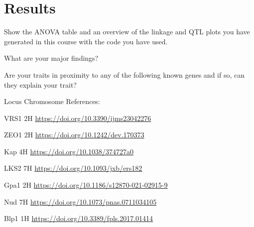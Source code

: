 \section{Results}

Show the ANOVA table and an overview of the linkage and QTL plots you have generated in this course with the code you have used.

What are your major findings?

Are your traits in proximity to any of the following known genes and if so, can they explain your trait?

Locus Chromosome References:

VRS1 2H \url{https://doi.org/10.3390/ijms23042276}

ZEO1 2H \url{https://doi.org/10.1242/dev.170373}

Kap 4H \url{https://doi.org/10.1038/374727a0}

LKS2 7H \url{https://doi.org/10.1093/jxb/ers182}

Gpa1 2H \url{https://doi.org/10.1186/s12870-021-02915-9}

Nud 7H \url{https://doi.org/10.1073/pnas.0711034105}

Blp1 1H \url{https://doi.org/10.3389/fpls.2017.01414}
